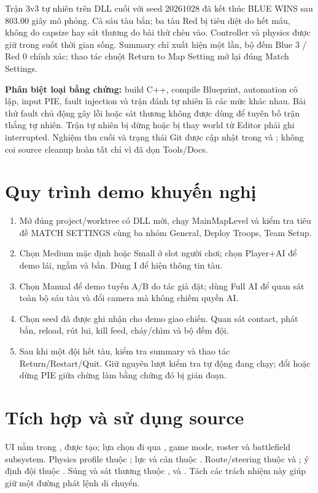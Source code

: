 Trận 3v3 tự nhiên trên DLL cuối với seed 20261028 đã kết thúc BLUE WINS sau 803.00 giây mô phỏng. Cả sáu tàu bắn; ba tàu Red bị tiêu diệt do hết máu, không do capsize hay sát thương do bài thử chèn vào. Controller và physics được giữ trong suốt thời gian sống. Summary chỉ xuất hiện một lần, bộ đếm Blue 3 / Red 0 chính xác; thao tác chuột Return to Map Setting mở lại đúng Match Settings.\par

\textbf{Phân biệt loại bằng chứng:} build C++, compile Blueprint, automation cô lập, input PIE, fault injection và trận đánh tự nhiên là các mức khác nhau. Bài thử fault chủ động gây lỗi hoặc sát thương không được dùng để tuyên bố trận thắng tự nhiên. Trận tự nhiên bị dừng hoặc bị thay world từ Editor phải ghi interrupted. Nghiệm thu cuối và trạng thái Git được cập nhật trong  và ; không coi source cleanup hoàn tất chỉ vì đã dọn Tools/Docs.

\section{Quy trình demo khuyến nghị}
\begin{enumerate}
\item Mở đúng project/worktree có DLL mới, chạy MainMapLevel và kiểm tra tiêu đề MATCH SETTINGS cùng ba nhóm General, Deploy Troops, Team Setup.
\item Chọn Medium mặc định hoặc Small ở slot người chơi; chọn Player+AI để demo lái, ngắm và bắn. Dùng I để hiện thông tin tàu.
\item Chọn Manual để demo tuyến A/B do tác giả đặt; dùng Full AI để quan sát toàn bộ sáu tàu và đổi camera mà không chiếm quyền AI.
\item Chọn seed đã được ghi nhận cho demo giao chiến. Quan sát contact, phát bắn, reload, rút lui, kill feed, cháy/chìm và bộ đếm đội.
\item Sau khi một đội hết tàu, kiểm tra summary và thao tác Return/Restart/Quit. Giữ nguyên lượt kiểm tra tự động đang chạy; đổi hoặc dừng PIE giữa chừng làm bằng chứng đó bị gián đoạn.
\end{enumerate}

\clearpage
\section{Tích hợp và sử dụng source}
UI nằm trong , được  tạo; lựa chọn đi qua , game mode, roster và battlefield subsystem. Physics profile thuộc ; lực và cản thuộc . Route/steering thuộc  và ; ý định đội thuộc . Súng và sát thương thuộc ,  và . Tách các trách nhiệm này giúp giữ một đường phát lệnh di chuyển.

